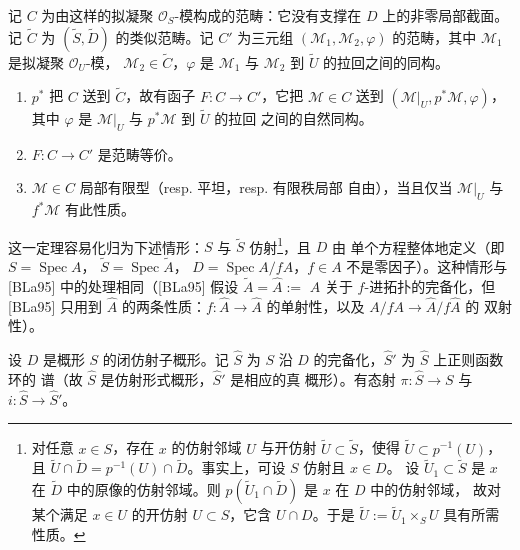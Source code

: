 记 $C$ 为由这样的拟凝聚 $\mathcal{O}_S$-模构成的范畴：它没有支撑在
$D$ 上的非零局部截面。记 $\widetilde{C}$ 为
$(\widetilde{S},\widetilde{D})$ 的类似范畴。记 $C'$ 为三元组
$(\mathcal{M}_1,\mathcal{M}_2,\varphi)$ 的范畴，其中
$\mathcal{M}_1$ 是拟凝聚 $\mathcal{O}_U$-模，
$\mathcal{M}_2\in\widetilde{C}$，$\varphi$ 是 $\mathcal{M}_1$ 与
$\mathcal{M}_2$ 到 $\widetilde{U}$ 的拉回之间的同构。
\begin{enumerate}[label=\arabic*),leftmargin=2.2em]
\item $p^{*}$ 把 $C$ 送到 $\widetilde{C}$，故有函子
  $F:C\to C'$，它把 $\mathcal{M}\in C$ 送到
  $(\mathcal{M}|_U,p^{*}\mathcal{M},\varphi)$，其中 $\varphi$ 是
  $\mathcal{M}|_U$ 与 $p^{*}\mathcal{M}$ 到 $\widetilde{U}$ 的拉回
  之间的自然同构。
\item $F:C\to C'$ 是范畴等价。
\item $\mathcal{M}\in C$ 局部有限型（resp. 平坦，resp. 有限秩局部
  自由），当且仅当 $\mathcal{M}|_U$ 与 $f^{*}\mathcal{M}$ 有此性质。
\end{enumerate}


这一定理容易化归为下述情形：$S$ 与 $\widetilde{S}$
仿射\footnote{对任意 $x\in S$，存在 $x$ 的仿射邻域 $U$ 与开仿射
$\widetilde{U}\subset\widetilde{S}$，使得
$\widetilde{U}\subset p^{-1}(U)$，且 $\widetilde{U}\cap\widetilde{D}
=p^{-1}(U)\cap\widetilde{D}$。事实上，可设 $S$ 仿射且 $x\in D$。
设 $\widetilde{U}_1\subset\widetilde{S}$ 是 $x$ 在
$\widetilde{D}$ 中的原像的仿射邻域。则
$p(\widetilde{U}_1\cap\widetilde{D})$ 是 $x$ 在 $D$ 中的仿射邻域，
故对某个满足 $x\in U$ 的开仿射 $U\subset S$，它含 $U\cap D$。于是
$\widetilde{U}:=\widetilde{U}_1\times_S U$ 具有所需性质。}，且 $D$ 由
单个方程整体地定义（即 $S=\operatorname{Spec}A$，
$\widetilde{S}=\operatorname{Spec}\widetilde{A}$，
$D=\operatorname{Spec}A/fA$，$f\in A$ 不是零因子）。这种情形与
[BLa95] 中的处理相同（[BLa95] 假设
$\widetilde{A}=\widehat{A}:=$ $A$ 关于 $f$-进拓扑的完备化，但
[BLa95] 只用到 $\widehat{A}$ 的两条性质：$f:\widehat{A}\to
\widehat{A}$ 的单射性，以及 $A/fA\to\widehat{A}/f\widehat{A}$ 的
双射性）。

 设 $D$ 是概形 $S$ 的闭仿射子概形。记 $\widehat{S}$ 为
$S$ 沿 $D$ 的完备化，$\widehat{S}'$ 为 $\widehat{S}$ 上正则函数环的
谱（故 $\widehat{S}$ 是仿射形式概形，$\widehat{S}'$ 是相应的真
概形）。有态射 $\pi:\widehat{S}\to S$ 与
$i:\widehat{S}\to\widehat{S}'$。

